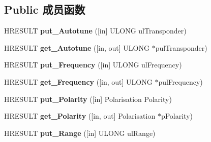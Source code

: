 \subsection*{Public 成员函数}
\begin{DoxyCompactItemize}
\item 
\mbox{\label{interface_i_b_d_a___frequency_filter_a3950a94ded2054d7af18b45f00756c89}} 
H\+R\+E\+S\+U\+LT {\bfseries put\+\_\+\+Autotune} (\mbox{[}in\mbox{]} U\+L\+O\+NG ul\+Transponder)
\item 
\mbox{\label{interface_i_b_d_a___frequency_filter_a1c77cd1130b12fcdeeb29aae3f4edf40}} 
H\+R\+E\+S\+U\+LT {\bfseries get\+\_\+\+Autotune} (\mbox{[}in, out\mbox{]} U\+L\+O\+NG $\ast$pul\+Transponder)
\item 
\mbox{\label{interface_i_b_d_a___frequency_filter_a0d04a414c81915cea635b95798416b35}} 
H\+R\+E\+S\+U\+LT {\bfseries put\+\_\+\+Frequency} (\mbox{[}in\mbox{]} U\+L\+O\+NG ul\+Frequency)
\item 
\mbox{\label{interface_i_b_d_a___frequency_filter_a647a09aa9d112835f93e1a4e2214f649}} 
H\+R\+E\+S\+U\+LT {\bfseries get\+\_\+\+Frequency} (\mbox{[}in, out\mbox{]} U\+L\+O\+NG $\ast$pul\+Frequency)
\item 
\mbox{\label{interface_i_b_d_a___frequency_filter_a67bee4be4e63bc232d31c5beaf9f7a37}} 
H\+R\+E\+S\+U\+LT {\bfseries put\+\_\+\+Polarity} (\mbox{[}in\mbox{]} Polarisation Polarity)
\item 
\mbox{\label{interface_i_b_d_a___frequency_filter_a4b4151fa0a3c27faadbfd829fb06a649}} 
H\+R\+E\+S\+U\+LT {\bfseries get\+\_\+\+Polarity} (\mbox{[}in, out\mbox{]} Polarisation $\ast$p\+Polarity)
\item 
\mbox{\label{interface_i_b_d_a___frequency_filter_aa8cc0f19a6bc3249b589e873dd7278cc}} 
H\+R\+E\+S\+U\+LT {\bfseries put\+\_\+\+Range} (\mbox{[}in\mbox{]} U\+L\+O\+NG ul\+Range)
\item 
\mbox{\label{interface_i_b_d_a___frequency_filter_a516a21c9e698992123a86d10faff71c5}} 

\end{DoxyCompactItemize}
